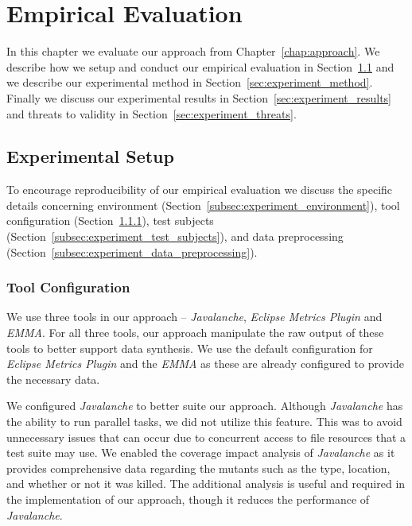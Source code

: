 \chapter{Empirical Evaluation}
\label{chap:experiment}
In this chapter we evaluate our approach from Chapter~\ref{chap:approach}. We describe how we setup and conduct our empirical evaluation in Section~\ref{sec:experiment_setup} and we describe our experimental method in Section~\ref{sec:experiment_method}. Finally we discuss our experimental results in Section~\ref{sec:experiment_results} and threats to validity in Section~\ref{sec:experiment_threats}.


\section{Experimental Setup}
\label{sec:experiment_setup}
To encourage reproducibility of our empirical evaluation we discuss the specific details concerning environment (Section~\ref{subsec:experiment_environment}), tool configuration (Section~\ref{subsec:experiment_tool_configuration}), test subjects (Section~\ref{subsec:experiment_test_subjects}), and data preprocessing (Section~\ref{subsec:experiment_data_preprocessing}).


\subsection{Tool Configuration}
\label{subsec:experiment_tool_configuration}
We use three tools in our approach -- \emph{Javalanche}, \emph{Eclipse Metrics Plugin} and \emph{EMMA}. For all three tools, our approach manipulate the raw output of these tools to better support data synthesis. We use the default configuration for \emph{Eclipse Metrics Plugin} and the \emph{EMMA} as these are already configured to provide the necessary data.

We configured \emph{Javalanche} to better suite our approach. Although \emph{Javalanche} has the ability to run parallel tasks, we did not utilize this feature. This was to avoid unnecessary issues that can occur due to concurrent access to file resources that a test suite may use. We enabled the coverage impact analysis of \emph{Javalanche} as it provides comprehensive data regarding the mutants such as the type, location, and whether or not it was killed. The additional analysis is useful and required in the implementation of our approach, though it reduces the performance of \emph{Javalanche}.

